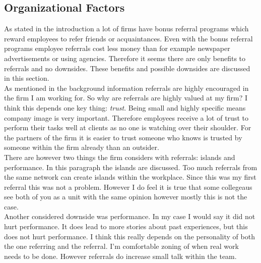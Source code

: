 \documentclass[Main.tex]{subfiles}
\begin{document}
\subsection*{Organizational Factors}

As stated in the introduction a lot of firms have bonus referral programs which reward employees to refer friends or acquaintances. Even with the bonus referral programs employee referrals cost less money than for example newspaper advertisements or using agencies. Therefore it seems there are only benefits to referrals and no downsides. These benefits and possible downsides are discussed in this section.\\

As mentioned in the background information referrals are highly encouraged in the firm I am working for. So why are referrals are highly valued at my firm? I think this depends one key thing: \emph{trust}. Being small and highly specific means company image is very important. Therefore employees receive a lot of trust to perform their tasks well at clients as no one is watching over their shoulder. For the partners of the firm it is easier to trust someone who knows is trusted by someone within the firm already than an outsider. \\

There are however two things the firm considers with referrals: islands and performance. In this paragraph the islands are discussed. Too much referrals from the same network can create islands within the workplace. Since this was my first referral this was not a problem. However I do feel it is true that some collegeaus see both of you as a unit with the same opinion however mostly this is not the case. \\

Another considered downside was performance. In my case I would say it did not hurt performance. It does lead to more stories about past experiences, but this does not hurt performance. I think this really depends on the personality of both the one referring and the referral. I'm comfortable zoning of when real work needs to be done. However referrals do increase small talk within the team. 
\end{document}
